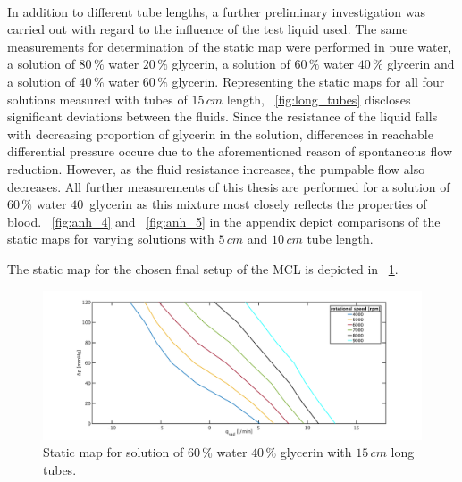 \\In addition to different tube lengths, a further preliminary investigation was carried out with regard to the influence of the test liquid used. The same measurements for determination of the static map were performed in pure water, a solution of $80\, \%$ water $20\, \%$ glycerin, a solution of $60\, \%$ water $40\, \%$ glycerin and a solution of $40\, \%$ water $60\, \%$ glycerin. Representing the static maps for all four solutions measured with tubes of $15\, cm$ length, \figurename~\ref{fig:long_tubes} discloses significant deviations between the fluids. Since the resistance of the liquid falls with decreasing proportion of glycerin in the solution, differences in reachable differential pressure occure due to the aforementioned reason of spontaneous flow reduction. However, as the fluid resistance increases, the pumpable flow also decreases. All further measurements of this thesis are performed for a solution of $60\, \%$ water $40\,$ glycerin as this mixture most closely reflects the properties of blood.
\figurename~\ref{fig:anh_4} and \figurename~\ref{fig:anh_5} in the appendix depict comparisons of the static maps for varying  solutions with $5\, cm$ and $10\, cm$ tube length.

The static map for the chosen final setup of the MCL is depicted in \figurename~\ref{fig:60w40glong}.

\begin{figure}[ht]
  \flushleft
  \includegraphics[width=\textwidth]{images/plots_syst_ident/60w40g_long.pdf}
  \caption[Static map for solution of $60\, \%$ water $40\, \%$ glycerin with $15\,cm$ long tubes]{Static map for solution of $60\, \%$ water $40\, \%$ glycerin with $15\,cm$ long tubes.}
  \label{fig:60w40glong}
\end{figure}

